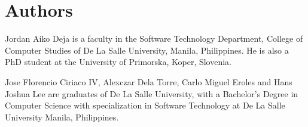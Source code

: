 \documentclass{sigchi-ext}
\begin{document}



\section{Authors}
Jordan Aiko Deja is a faculty in the Software Technology Department, College of Computer Studies of De La Salle University, Manila, Philippines. He is also a PhD student at the University of Primorska, Koper, Slovenia. 

Jose Florencio Ciriaco IV, Alexczar Dela Torre, Carlo Miguel Eroles and Hans Joshua Lee are graduates of De La Salle University, with a Bachelor's Degree in Computer Science with specialization in Software Technology at De La Salle University Manila, Philippines.






\end{document}
